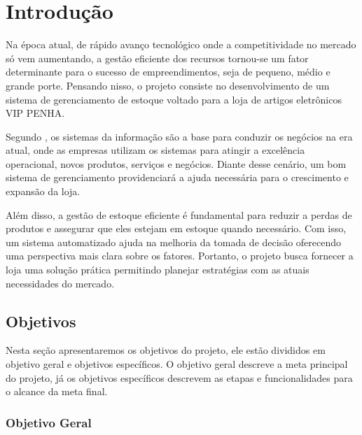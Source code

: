 \documentclass[
	12pt,				%
	openany,			%
	twoside,			%
	a4paper,			%
	english,			%
	brazil				%
	]{abntex2}
\begin{document}
\textual

\chapter{Introdução}

Na época atual, de rápido avanço tecnológico onde a competitividade no mercado só vem aumentando, a gestão eficiente dos recursos tornou-se um fator determinante para o sucesso de empreendimentos, seja de pequeno, médio e grande porte. Pensando nisso, o projeto consiste no desenvolvimento de um sistema de gerenciamento de estoque voltado para a loja de artigos eletrônicos VIP PENHA.

Segundo   , os sistemas da informação são a base para conduzir os negócios na era atual, onde as empresas utilizam os sistemas para atingir a excelência operacional, novos produtos, serviços e negócios. Diante desse cenário, um bom sistema de gerenciamento providenciará a ajuda necessária para o crescimento e expansão da loja.

Além disso, a gestão de estoque eficiente é fundamental para reduzir a perdas de produtos e assegurar que eles estejam em estoque quando necessário. Com isso, um sistema automatizado ajuda na melhoria da tomada de decisão oferecendo uma perspectiva mais clara sobre os fatores. Portanto, o projeto busca fornecer a loja uma solução prática permitindo planejar estratégias com as atuais necessidades do mercado.


\section{Objetivos}

Nesta seção apresentaremos os objetivos do projeto, ele estão divididos em objetivo geral e objetivos específicos. O objetivo geral descreve a meta principal do projeto, já os objetivos específicos descrevem as etapas e funcionalidades para o alcance da meta final.

\subsection{Objetivo Geral}
\end{document}
